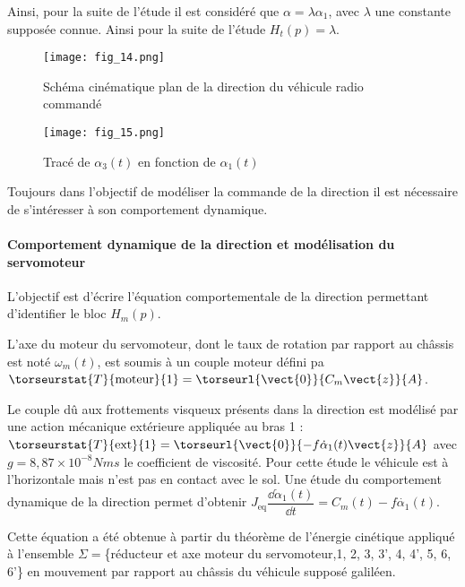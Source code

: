 Ainsi, pour la suite de l’étude il est considéré que $\alpha=\lambda\alpha_1$, avec $\lambda$ une constante supposée connue. Ainsi pour la suite de l’étude $H_t(p)=\lambda$.



\begin{figure}[H]
\centering
\texttt{[image: fig\_14.png]}
\caption{Schéma cinématique plan de la direction du véhicule radio commandé \label{fig_14}}
\end{figure}


\begin{figure}[H]
\centering
\texttt{[image: fig\_15.png]}
\caption{Tracé de $\alpha_3(t)$ en fonction de $\alpha_1(t)$ \label{fig_15}}
\end{figure}

Toujours dans l’objectif de modéliser la commande de la direction il est nécessaire de s’intéresser à son comportement dynamique.

\paragraph{Comportement dynamique de la direction et modélisation du servomoteur}

\begin{obj}
L’objectif est d’écrire l’équation comportementale de la direction permettant d’identifier le bloc $H_m(p)$.
\end{obj}

L’axe du moteur du servomoteur, dont le taux de rotation par rapport au châssis est noté $\omega_m(t)$, est soumis à un couple moteur défini pa
$\torseurstat{T}{\text{moteur}}{1} =\torseurl{\vect{0}}{C_m\vect{z}}{A}$. 

Le couple dû aux frottements visqueux présents dans la direction est modélisé par une action mécanique extérieure appliquée au bras 1 : $\torseurstat{T}{\text{ext}}{1} = \torseurl{\vect{0}}{-f\dot{\alpha}_1(t) \vect{z}}{A}$ avec $g = 8,87 \times 10^{-8} \si{Nms}$  le coefficient de viscosité.
Pour cette étude le véhicule est à l’horizontale mais n’est pas en contact avec le sol. Une étude du comportement
dynamique de la direction permet d’obtenir 
$J_{\text{eq}}\dfrac{\dd\dot{\alpha}_1(t)}{\dd t} = C_m(t)-f\dot{\alpha_1}(t)$.

Cette équation a été obtenue à partir du théorème de l’énergie cinétique appliqué à l’ensemble 
$\Sigma =$\{réducteur et axe moteur du servomoteur,1, 2, 3, 3’, 4, 4’, 5, 6, 6’\} en mouvement par rapport au châssis du véhicule supposé galiléen.



